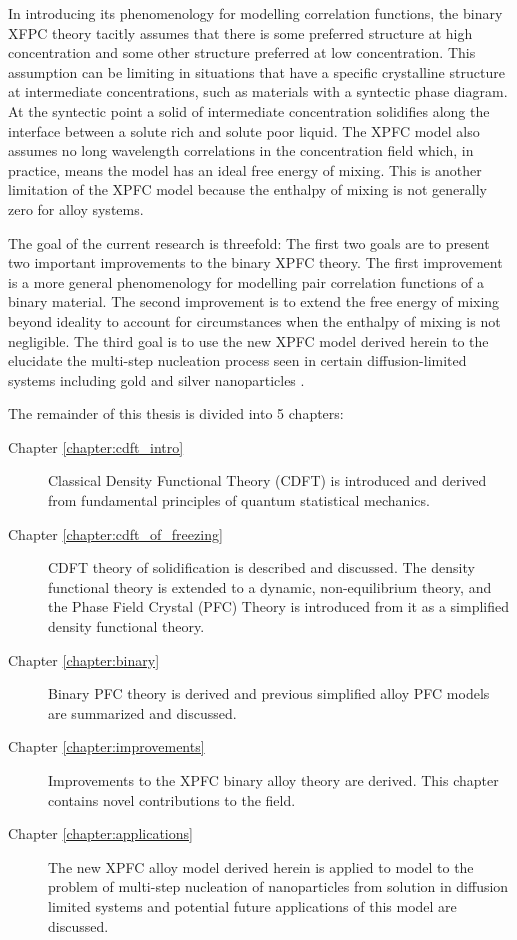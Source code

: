 
In introducing its phenomenology for modelling correlation functions, the
binary XFPC theory tacitly assumes that there is some preferred structure at
high concentration and some other structure preferred at low concentration.
This assumption can be limiting in situations that have a specific crystalline
structure at intermediate concentrations, such as materials with a syntectic
phase diagram. At the syntectic point a solid of intermediate concentration
solidifies along the interface between a solute rich and solute poor liquid.
The XPFC model also assumes no long wavelength correlations in the
concentration field which, in practice, means the model has an ideal free
energy of mixing.  This is another limitation of the XPFC model because the
enthalpy of mixing is not generally zero for alloy systems.


The goal of the current research is threefold: The first two goals are to
present two important improvements to the binary XPFC theory. The first
improvement is a more general phenomenology for modelling pair correlation
functions of a binary material. The second improvement is to extend the free
energy of mixing beyond ideality to account for circumstances when the enthalpy of
mixing is not negligible. The third goal is to use the new XPFC model derived
herein to the elucidate the multi-step nucleation process seen in certain
diffusion-limited systems including gold and silver nanoparticles \cite{LOH17}.


The remainder of this thesis is divided into 5 chapters:
%
\begin{description}
    \item [Chapter \ref{chapter:cdft_intro}] { Classical Density Functional
        Theory (CDFT) is introduced and derived from fundamental principles of
        quantum statistical mechanics.
    }
    \item [Chapter \ref{chapter:cdft_of_freezing}] { CDFT theory of
        solidification is described and discussed. The density functional
        theory is extended to a dynamic, non-equilibrium theory, and the Phase
        Field Crystal (PFC) Theory is introduced from it as a simplified
        density functional theory.
    }
    \item [Chapter \ref{chapter:binary}] {Binary PFC theory is derived and
        previous simplified alloy PFC models are summarized and discussed.
    }
    \item [Chapter \ref{chapter:improvements}] {Improvements to the XPFC binary
        alloy theory are derived. This chapter contains novel contributions to
        the field.
    }
    \item [Chapter \ref{chapter:applications}] {The new XPFC alloy model
        derived herein is applied to model to the problem of multi-step
        nucleation of nanoparticles from solution in diffusion limited systems
        and potential future applications of this model are discussed.
    } 
\end{description}
%
